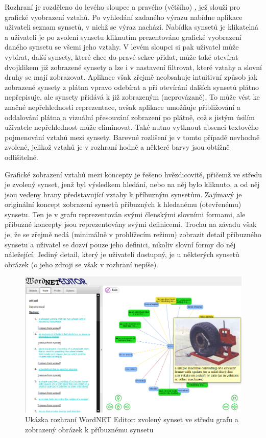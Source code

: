 \documentclass[a4paper, 11pt, oneside]{book}
\begin{document}
					Rozhraní je rozděleno do levého sloupce a pravého (většího) , jež slouží pro grafické vyobrazení vztahů. Po vyhledání zadaného výrazu nabídne aplikace uživateli seznam synsetů, v nichž se výraz nachází. Nabídka synsetů je klikatelná a uživateli je po zvolení synsetu kliknutím prezentováno grafické vyobrazení daného synsetu se všemi jeho vztahy. V levém sloupci si pak uživatel může vybírat, další synsety, které chce do pravé sekce přidat, může také otevírat dvojklikem již zobrazené synsety a lze i v nastavení filtrovat, které vztahy a slovní druhy se mají zobrazovat. Aplikace však zřejmě neobsahuje intuitivní způsob jak zobrazené synsety z plátna vpravo odebírat a při otevírání dalších synsetů plátno nepřepisuje, ale synsety přidává k již zobrazeným (neprovázaně). To může vést ke značné nepřehlednosti reprezentace, avšak aplikace umožňuje přibližování a oddalování plátna a vizuální přesouvání zobrazení po plátně, což s jistým úsilím uživatele nepřehlednost může eliminovat. Také nutno vytknout absenci textového pojmenování vztahů mezi synsety. Barevné rozlišení je v tomto případě nevhodně zvolené, jelikož vztahů je v rozhraní hodně a některé barvy jsou obtížně odlišitelné.

					Grafické zobrazení vztahů mezi koncepty je řešeno hvězdicovitě, přičemž ve středu je zvolený synset, jenž byl výsledkem hledání, nebo na něj bylo kliknuto, a od něj jsou vedeny hrany představující vztahy k příbuzným synsetům. Zajímavý je originální koncept zobrazení synsetů příbuzných k hledanému (otevřenému) synsetu. Ten je v grafu reprezentován svými členskými slovními formami, ale příbuzné koncepty jsou reprezentovány svými definicemi. Trochu na závadu však je, že se zřejmě nedá (minimálně v prohlížecím režimu) zobrazit detail příbuzného synsetu a uživatel se dozví pouze jeho definici, nikoliv slovní formy do něj náležející. Jediný detail, který je uživateli dostupný, je u některých synsetů obrázek (o jeho zdroji se však v rozhraní nepíše).

					\begin{figure}[h]
						\centering
						\includegraphics[width=1.0\textwidth]{wneditor.png}
						\caption{Ukázka rozhraní WordNET Editor: zvolený synset ve středu grafu a zobrazený obrázek k příbuznému synsetu}
						\label{fig:wneditor}
					\end{figure}
\end{document}
